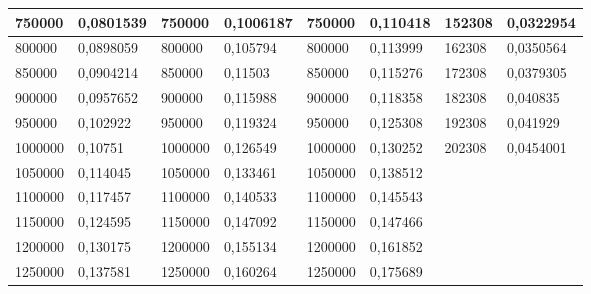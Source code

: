 \documentclass[11pt,openany]{book}
\begin{document}
\begin{table}[!ht]
\begin{tabular}{|l|l|l|l|l|l|l|l|}
        750000 & 0,0801539 & 750000 & 0,1006187 & 750000 & 0,110418 & 152308 & 0,0322954 \\ \hline
        800000 & 0,0898059 & 800000 & 0,105794 & 800000 & 0,113999 & 162308 & 0,0350564 \\ \hline
        850000 & 0,0904214 & 850000 & 0,11503 & 850000 & 0,115276 & 172308 & 0,0379305 \\ \hline
        900000 & 0,0957652 & 900000 & 0,115988 & 900000 & 0,118358 & 182308 & 0,040835 \\ \hline
        950000 & 0,102922 & 950000 & 0,119324 & 950000 & 0,125308 & 192308 & 0,041929 \\ \hline
        1000000 & 0,10751 & 1000000 & 0,126549 & 1000000 & 0,130252 & 202308 & 0,0454001 \\ \hline
        1050000 & 0,114045 & 1050000 & 0,133461 & 1050000 & 0,138512 & ~ & ~ \\ \hline
        1100000 & 0,117457 & 1100000 & 0,140533 & 1100000 & 0,145543 & ~ & ~ \\ \hline
        1150000 & 0,124595 & 1150000 & 0,147092 & 1150000 & 0,147466 & ~ & ~ \\ \hline
        1200000 & 0,130175 & 1200000 & 0,155134 & 1200000 & 0,161852 & ~ & ~ \\ \hline
        1250000 & 0,137581 & 1250000 & 0,160264 & 1250000 & 0,175689 & ~ & \\\hline
    \end{tabular}
\end{table}
\end{document}

